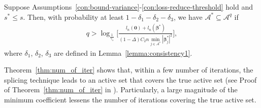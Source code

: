 \begin{theorem}\label{thm:num_of_iter}
Suppose Assumptions~\ref{con:bound-variance}-\ref{con:loss-reduce-threshold} hold and $s^* \leq s$.
Then, with probability at least $1- \delta_{1}-\delta_{2}-\delta_{3}$, we have $\mathcal{A}^{*} \subseteq \mathcal{A}^q$ if
\begin{align*}
q > \log_{\frac{1}{\gamma_{s}}}\bigg[\frac{l_n(\boldsymbol 0) + l_n(\boldsymbol\beta^*)}{(1 - \Delta)C_{2}n\min\limits_{j\in \mathcal{A}^*} |\boldsymbol{\beta}_j^*|^2}\bigg],
\end{align*}
where $\delta_{1}$, $\delta_{2}$, $\delta_{3}$ are defined in Lemma~\ref{lemma:consistency1}.
\end{theorem}
Theorem~\ref{thm:num_of_iter} shows that, within a few
number of iterations, the splicing technique leads to an active set that covers the true active set
(see Proof of Theorem~\ref{thm:num_of_iter} in \fi).
Particularly, a large magnitude of the minimum coefficient lessens
the number of iterations covering the true active set.

